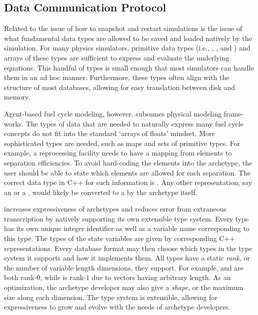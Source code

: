 \subsection{Data Communication Protocol}

Related to the issue of how to snapshot and restart simulations is the issue of 
what fundamental data types are allowed to be saved and loaded natively by the 
simulation. For many physics simulators, primitive data types (i.e., , 
, and ) and arrays of these types are sufficient to 
express and evaluate the underlying equations. This handful of types is small enough 
that most simulators can handle them in an ad hoc manner. Furthermore, these types
often align with the structure of most databases, allowing for easy translation
between disk and memory.

Agent-based fuel cycle modeling, however, subsumes physical modeling frame-works.
The types of data that are needed to naturally express many fuel cycle concepts 
do not fit into the standard `arrays of floats' mindset.  More sophisticated types are needed,
such as maps and sets of primitive types. For example, 
a reprocessing facility needs to have a mapping from elements to separation 
efficiencies. To avoid hard-coding the elements into the archetype, the user should 
be able to state which elements are allowed for each separation. The correct data
type in C++ for such information is . Any other 
representation, say an  or a ,  would likely be converted to 
a  by the archetype itself.

\Cyclus increases expressiveness of archetypes and reduces error from extraneous 
transcription by natively supporting its own extensible type system. Every type
has its own unique integer identifier as well as 
a variable name corresponding to this type. 
The types of the state variables are given by corresponding C++ representations.
Every database format may then choose which types in the type system it 
supports and how it implements them. All types have a static \emph{rank}, or the 
number of variable length dimensions, they support.  For example,  and 
 are both rank-0, while  is rank-1 due to 
vectors having arbitrary length. As an optimization, the archetype developer 
may also give a \emph{shape}, or the maximum size along each dimension. 
The type system is extensible, 
allowing for expressiveness to grow and evolve with the needs of archetype developers.

